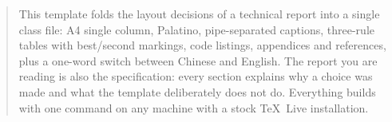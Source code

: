 \documentclass[logo]{boogonreport}
\begin{document}
\maketitle

\begin{abstract}
This template folds the layout decisions of a technical report into a single class
file: A4 single column, Palatino, pipe-separated captions, three-rule tables with
best/second markings, code listings, appendices and references, plus a one-word
switch between Chinese and English. The report you are reading is also the
specification: every section explains why a choice was made and what the template
deliberately does not do. Everything builds with one command on any machine with a
stock TeX~Live installation.
\end{abstract}



\newpage
\tableofcontents
\newpage










\appendix

\end{document}
